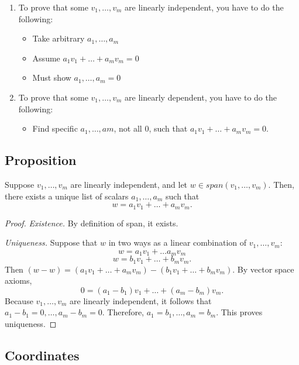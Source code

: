 \documentclass[11pt]{article}
\begin{document}
    \begin{enumerate}
        \item To prove that some \(v_1, \dots, v_m\) are linearly independent, you have to do the following:
        \begin{itemize}
            \item Take arbitrary \(a_1, \dots, a_m\)
            \item Assume \(a_1 v_1 + \dots + a_m v_m = 0\)
            \item Must show \(a_1, \dots, a_m = 0\)
        \end{itemize}

        \item To prove that some \(v_1, \dots, v_m\) are linearly dependent, you have to do the following:
        \begin{itemize}
            \item Find specific \(a_1, \dots, am\), not all 0, such that \(a_1 v_1 + \dots + a_m v_m = 0.\)
        \end{itemize}
    \end{enumerate}

    \subsection{Proposition}

    Suppose \(v_1, \dots, v_m\) are linearly independent, and let \(w \in span(v_1, \dots, v_m)\). Then, there exists a unique list of scalars \(a_1, \dots, a_m\) such that \[w = a_1 v_1 + \dots + a_m v_m.\]

    \begin{proof}
        \emph{Existence.} By definition of span, it exists.

        \emph{Uniqueness.} Suppose that $w$ in two ways as a linear combination of \(v_1, \dots, v_m\): \[w = a_1 v_1 + \dots a_m v_m\] \[w = b_1 v_1 + \dots + b_m v_m.\] Then \((w-w) = (a_1 v_1 + \dots + a_m v_m) - (b_1 v_1 + \dots + b_m v_m).\) By vector space axioms, \[0 = (a_1 - b_1) v_1 + \dots + (a_m - b_m) v_m.\] Because \(v_1, \dots, v_m\) are linearly independent, it follows that \(a_1 - b_1 = 0, \dots, a_m - b_m = 0.\) Therefore, \(a_1 = b_1, \dots, a_m = b_m.\) This proves uniqueness.
    \end{proof}

    \subsection{Coordinates}
\end{document}
